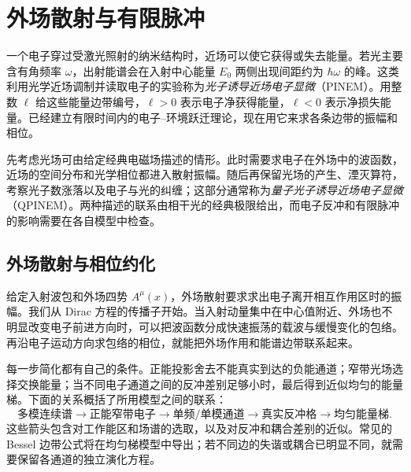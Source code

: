 \chapter{外场散射与有限脉冲}\label{chap:external-pinem}

一个电子穿过受激光照射的纳米结构时，近场可以使它获得或失去能量。若光主要含有角频率 $\omega$，出射能谱会在入射中心能量 $E_0$ 两侧出现间距约为 $\hbar\omega$ 的峰。这类利用光学近场调制并读取电子的实验称为\emph{光子诱导近场电子显微}（PINEM）。用整数 $\ell$ 给这些能量边带编号，$\ell>0$ 表示电子净获得能量，$\ell<0$ 表示净损失能量。已经建立有限时间内的电子--环境跃迁理论，现在用它来求各条边带的振幅和相位。

先考虑光场可由给定经典电磁场描述的情形。此时需要求电子在外场中的波函数，近场的空间分布和光学相位都进入散射振幅。随后再保留光场的产生、湮灭算符，考察光子数涨落以及电子与光的纠缠；这部分通常称为\emph{量子光子诱导近场电子显微}（QPINEM）。两种描述的联系由相干光的经典极限给出，而电子反冲和有限脉冲的影响需要在各自模型中检查。\cite{Feist2015Nature,Wang2020Cavity,Dahan2021Science,Ruimy2025Perspective}

\section{外场散射与相位约化}

给定入射波包和外场四势 $A^\mu(x)$，外场散射要求求出电子离开相互作用区时的振幅。我们从 Dirac 方程的传播子开始。当入射动量集中在中心值附近、外场也不明显改变电子前进方向时，可以把波函数分成快速振荡的载波与缓慢变化的包络。再沿电子运动方向求包络的相位，就能把外场作用和能谱边带联系起来。

每一步简化都有自己的条件。正能投影舍去不能真实到达的负能通道；窄带光场选择交换能量；当不同电子通道之间的反冲差别足够小时，最后得到近似均匀的能量梯。下面的关系概括了所用模型之间的联系：
\begin{equation}
{
\text{多模连续谱}
\longrightarrow
\text{正能窄带电子}
\longrightarrow
\text{单频/单模通道}
\longrightarrow
\text{真实反冲格}
\longrightarrow
\text{均匀能量梯}.}
\label{eq:pinem_reduction_spine}
\end{equation}
这些箭头包含对工作能区和场谱的选取，以及对反冲和耦合差别的近似。常见的 Bessel 边带公式将在均匀梯模型中导出；若不同边的失谐或耦合已明显不同，就需要保留各通道的独立演化方程。

